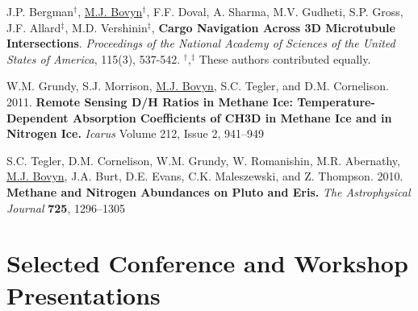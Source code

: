 \documentclass[letterpaper,10pt]{article} %
\begin{document}
\begin{description}[itemsep=-1ex]
\item J.P. Bergman$^\dagger$, \underline{M.J. Bovyn}$^\dagger$, F.F. Doval, A. Sharma, M.V. Gudheti, S.P. Gross, J.F. Allard$^\ddagger$, M.D. Vershinin$^\ddagger$, \textbf{Cargo Navigation Across 3D Microtubule Intersections}. \textit{Proceedings of the National Academy of Sciences of the United States of America}, 115(3), 537-542. $^\dagger$,$^\ddagger$ These authors contributed equally.

\item W.M. Grundy, S.J. Morrison, \underline{M.J. Bovyn}, S.C. Tegler, and D.M. Cornelison. 2011. \textbf{Remote Sensing D/H Ratios in Methane Ice: Temperature-Dependent Absorption Coefficients of CH3D in Methane Ice and in Nitrogen Ice.} \textit{Icarus} Volume 212, Issue 2, 941--949

\item S.C. Tegler, D.M. Cornelison, W.M. Grundy, W. Romanishin, M.R. Abernathy, \underline{M.J. Bovyn}, J.A. Burt, D.E. Evans, C.K. Maleszewski, and Z. Thompson. 2010. \textbf{Methane and Nitrogen Abundances on Pluto and Eris.} \textit{The Astrophysical Journal} \textbf{725}, 1296--1305
\end{description}


\section*{Selected Conference and Workshop Presentations}
\end{document}
